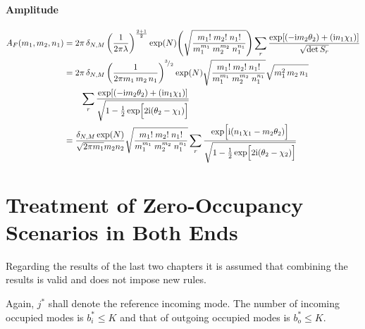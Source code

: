 \documentclass[
	english,
	a4paper,
	fontsize=10pt,
	parskip=half,
	titlepage=true,
	DIV=12,
	final
]{scrreprt}
\newcommand*{\smallfrac}  [2]{\ensuremath{{}^        {#1} \!/_        {#2}}}
\newcommand*{\iunit}{\ensuremath{\mathrm{i}}}
\begin{document}
\subsubsection{Amplitude}
\begin{align}
	A_F(m_1, m_2, n_1)
&=
	2\pi \, \delta_{N,M} \, \qty(
		\frac{1}{2\pi\lambda}
	)^{\frac{2 + 1}{2}}
	\exp(N)
	\qty(
		\sqrt{\frac
			{ m_1!      \; m_2!     \; n_1! }
			{ m_1^{m_1} \;m_2^{m_2} \; n_1^{n_1} }
	})
	\sum_r
		\frac
		{\exp[
			\qty(- \iunit m_2 \theta_2) + 
			\qty(  \iunit n_1 \chi  _1)
		]}
		{\sqrt{\det S_r}}
	\\
&=
\nonumber
	2\pi \, \delta_{N,M} \, \qty(
		\frac{1}{2\pi m_1 \, m_2 \, n_1}
	)^{\smallfrac{3}{2}}
	\exp(N)
	\sqrt{\frac
		{ m_1!      \; m_2!     \; n_1! }
		{ m_1^{m_1} \;m_2^{m_2} \; n_1^{n_1} }
	}
	\sqrt{m_1^2 \, m_2 \, n_1}
\\ &\qquad
	\sum_r
		\frac
		{\exp[
			\qty(- \iunit m_2 \theta_2) + 
			\qty(  \iunit n_1 \chi  _1)
		]}
		{\sqrt{1 - \frac{1}{2} \exp[\Big. 2\iunit (\theta_2 - \chi_1)]}}
	\\
&=
	\frac
		{\delta_{N,M} \exp(N)}
		{\sqrt{2\pi m_1} m_2 n_2}
	\sqrt{\frac
		{ m_1!      \; m_2!     \; n_1! }
		{ m_1^{m_1} \;m_2^{m_2} \; n_1^{n_1} }
	}
	\sum_r \frac
		{\exp[ \Big. \iunit
			\qty( n_1 \chi_1 - m_2 \theta_2 )
		]}
		{\sqrt{1 - \frac{1}{2} \exp[\Big. 2\iunit (\theta_2 - \chi_2)]}}
\end{align}

\chapter{Treatment of Zero-Occupancy Scenarios in Both Ends}
Regarding the results of the last two chapters it is assumed that combining the results is valid and does not impose new rules.

Again, $j^*$ shall denote the reference incoming mode. The number of incoming occupied modes is 
$b_i^* \leq K$ and that of outgoing occupied modes is $b_o^* \leq K$.
\end{document}
